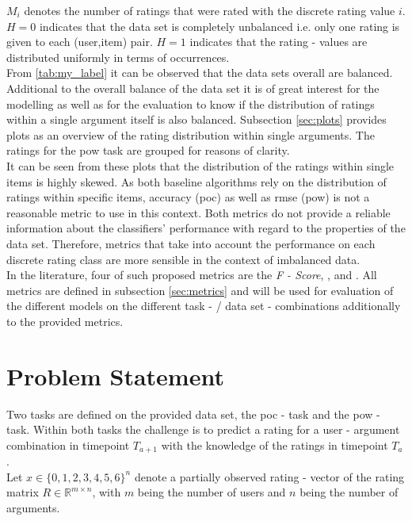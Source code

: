 \noindent $M_i$ denotes the number of ratings that were rated with the discrete rating value $i$.\\
\noindent $H=0$ indicates that the data set is completely unbalanced i.e. only one rating is given to each (user,item) pair. $H=1$ indicates that the rating - values are distributed uniformly in terms of occurrences.\\
From \autoref{tab:my_label} it can be observed that the data sets overall are balanced.  Additional to the overall balance of the data set it is of great interest for the modelling as well as for the evaluation to know if the distribution of ratings within a single argument itself is also balanced. Subsection \ref{sec:plots} provides plots as an overview of the rating distribution within single arguments. The ratings for the \acrshort{pow} task are grouped for reasons of clarity.\\
It can be seen from these plots that the distribution of the ratings within single items is highly skewed. As both baseline algorithms rely on the distribution of ratings within specific items, accuracy (\acrshort{poc}) as well as \acrfull{rmse} (\acrshort{pow}) is not a reasonable metric to use in this context. Both metrics do not provide a reliable information about the classifiers' performance with regard to the properties of the data set. Therefore, metrics that take into account the performance on each discrete rating class are more sensible in the context of imbalanced data.\\
In the literature, four of such proposed metrics are the \textit{F - Score}, ,  and  \cite{he2009learning}. All metrics are defined in subsection \ref{sec:metrics} and will be used for evaluation of the different models on the different task - / data set - combinations additionally to the provided metrics.

\section{Problem Statement}
Two tasks are defined on the provided data set, the \acrshort{poc} - task and the \acrshort{pow} - task. Within both tasks the challenge is to predict a rating for a user - argument combination in timepoint $T_{a+1}$ with the knowledge of the ratings in timepoint $T_a$.\\ Let $x \in \{0,1,2,3,4,5,6\}^{n}$ denote a partially observed rating - vector of the rating matrix $R \in \mathbb{R}^{m \times n}$, with $m$ being the number of users and $n$ being the number of arguments.
